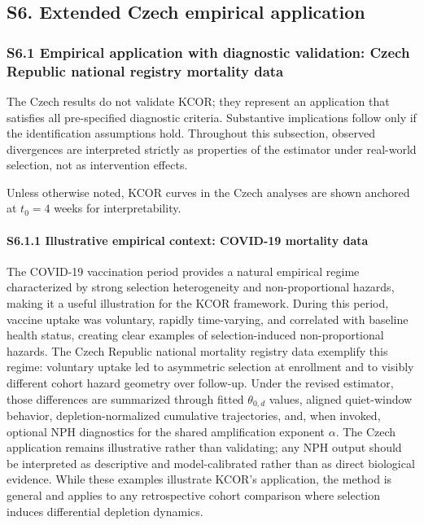\documentclass[
]{article}
\begin{document}
\subsection{S6. Extended Czech empirical
application}\label{s6.-extended-czech-empirical-application}

\subsubsection{S6.1 Empirical application with diagnostic validation:
Czech Republic national registry mortality
data}\label{s6.1-empirical-application-with-diagnostic-validation-czech-republic-national-registry-mortality-data}

The Czech results do not validate KCOR; they represent an application
that satisfies all pre-specified diagnostic criteria. Substantive
implications follow only if the identification assumptions hold.
Throughout this subsection, observed divergences are interpreted
strictly as properties of the estimator under real-world selection, not
as intervention effects.

Unless otherwise noted, KCOR curves in the Czech analyses are shown
anchored at \(t_0 = 4\) weeks for interpretability.

\paragraph{S6.1.1 Illustrative empirical context: COVID-19 mortality
data}\label{s6.1.1-illustrative-empirical-context-covid-19-mortality-data}

The COVID-19 vaccination period provides a natural empirical regime
characterized by strong selection heterogeneity and non-proportional
hazards, making it a useful illustration for the KCOR framework. During
this period, vaccine uptake was voluntary, rapidly time-varying, and
correlated with baseline health status, creating clear examples of
selection-induced non-proportional hazards. The Czech Republic national
mortality registry data exemplify this regime: voluntary uptake led to
asymmetric selection at enrollment and to visibly different cohort
hazard geometry over follow-up. Under the revised estimator, those
differences are summarized through fitted \(\theta_{0,d}\) values,
aligned quiet-window behavior, depletion-normalized cumulative
trajectories, and, when invoked, optional NPH diagnostics for the shared
amplification exponent \(\alpha\). The Czech application remains
illustrative rather than validating; any NPH output should be
interpreted as descriptive and model-calibrated rather than as direct
biological evidence. While these examples illustrate KCOR's application,
the method is general and applies to any retrospective cohort comparison
where selection induces differential depletion dynamics.
\end{document}
